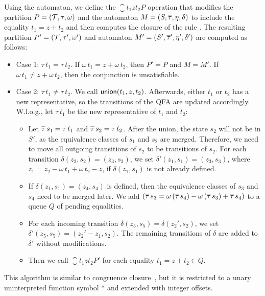 Using the automaton, we define the $\closure{t_1}{z}{t_2}{P}$ operation that modifies the partition $P = (\mathcal{T}, \tau, \omega)$ and the automaton $M = (S, \overline{\tau}, \eta, \delta)$ to include the equality $t_1 = z + t_2$ and then computes the closure of the rule .
The resulting partition $P' = (\mathcal{T}, \tau', \omega')$ and automaton $M' = (S', \overline{\tau}', \eta', \delta')$  are computed as follows:
\begin{itemize}
  \item Case 1: $\tau\,t_1 = \tau\,t_2$. If $\omega\,t_1 = z + \omega\,t_2$, then $P' = P$ and $M = M'$.
        If $\omega\,t_1 \neq z + \omega\,t_2$, then the conjunction is unsatisfiable.
  \item Case 2: $\tau\,t_1 \neq \tau\,t_2$. We call $\textsf{union}(t_1, z, t_2)$.
        Afterwards, either $t_1$ or $t_2$ has a new representative, so the transitions of the QFA are updated accordingly.
        W.l.o.g., let $\tau\,t_1$ be the new representative of $t_1$ and $t_2$:
        \begin{itemize}
          \item Let $\overline{\tau}\,s_1 = \tau\,t_1$ and $\overline{\tau}\,s_2 = \tau\,t_2$.
                After the union, the state $s_2$ will not be in $S'$, as the equivalence classes of $s_1$ and $s_2$ are merged.
                Therefore, we need to move all outgoing transitions of $s_2$ to be transitions of $s_2$.
                For each transition $\delta(z_2, s_2) = (z_3, s_3)$, we set $\delta'(z_1, s_1) = (z_3, s_3)$, where $z_1 = z_2 - \omega\,t_1 + \omega\,t_2 - z$, if $\delta(z_1,s_1)$ is not already defined.
          \item If $\delta(z_1,s_1) = (z_4, s_4)$ is defined, then the equivalence classes of $s_3$ and $s_4$ need to be merged later.
                We add $(\overline{\tau}\,s_3 = \omega\,(\overline{\tau}\,s_4) - \omega\,(\overline{\tau}\,s_3) + \overline{\tau}\,s_4)$ to a queue $Q$ of pending equalities.
          \item For each incoming transition $\delta(z_5, s_5) = \delta(z_2', s_2)$, we set $\delta'(z_5, s_5) = (z_2' - z_1, s_2)$.
                The remaining transitions of $\delta$ are added to $\delta'$ without modifications.
          \item Then we call $\closure{t_1}{z}{t_2}{P'}$ for each equality $t_1 = z + t_2 \in Q$.
        \end{itemize}
\end{itemize}

This algorithm is similar to congruence closure~\cite{cc-tarjan,cc-shostak}, but it is restricted to a unary uninterpreted function symbol $*$ and extended with integer offsets.

